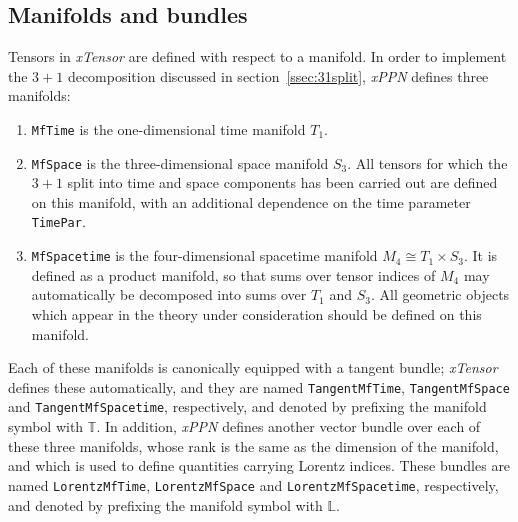 \documentclass[notitlepage,a4paper,aps,prd,onecolumn,superscriptaddress,nofootinbib,groupedaddress,longbibliography]{revtex4-1}
\newcommand{\xPPN}{\emph{xPPN}}
\newcommand{\xTensor}{\emph{xTensor}}
\begin{document}
\subsection{Manifolds and bundles}\label{ssec:bundles}
Tensors in \xTensor{} are defined with respect to a manifold. In order to implement the $3+1$ decomposition discussed in section~\ref{ssec:31split}, \xPPN{} defines three manifolds:
\begin{enumerate}
\item
\lstinline/MfTime/ is the one-dimensional time manifold \(T_1\).
\item
\lstinline/MfSpace/ is the three-dimensional space manifold \(S_3\). All tensors for which the $3+1$ split into time and space components has been carried out are defined on this manifold, with an additional dependence on the time parameter \lstinline/TimePar/.
\item
\lstinline/MfSpacetime/ is the four-dimensional spacetime manifold \(M_4 \cong T_1 \times S_3\). It is defined as a product manifold, so that sums over tensor indices of \(M_4\) may automatically be decomposed into sums over \(T_1\) and \(S_3\). All geometric objects which appear in the theory under consideration should be defined on this manifold.
\end{enumerate}
Each of these manifolds is canonically equipped with a tangent bundle; \xTensor{} defines these automatically, and they are named \lstinline/TangentMfTime/, \lstinline/TangentMfSpace/ and \lstinline/TangentMfSpacetime/, respectively, and denoted by prefixing the manifold symbol with \(\mathbb{T}\). In addition, \xPPN{} defines another vector bundle over each of these three manifolds, whose rank is the same as the dimension of the manifold, and which is used to define quantities carrying Lorentz indices. These bundles are named \lstinline/LorentzMfTime/, \lstinline/LorentzMfSpace/ and \lstinline/LorentzMfSpacetime/, respectively, and denoted by prefixing the manifold symbol with \(\mathbb{L}\).
\end{document}
